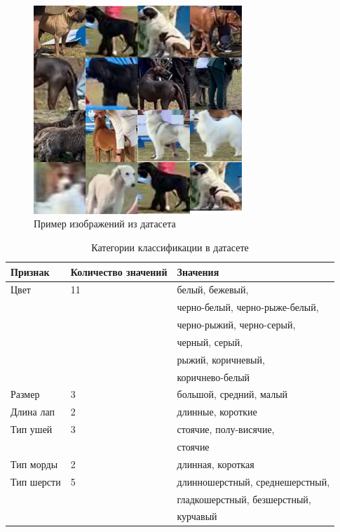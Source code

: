 \begin{figure}[ht]
	\centering
	\includegraphics[width=0.7\textwidth]{images/petsearch/dataset.jpg}
	\caption{Пример изображений из датасета}
	\label{fig:petsearch_dataset}
\end{figure}

\begin{table}[]
    \centering
    \caption{Категории классификации в датасете}
    \begin{tabular}{|l|l|l|}
        \hline
        \multicolumn{1}{|l|}{Признак} & \multicolumn{1}{l|}{Количество значений} & 
        \multicolumn{1}{l|}{Значения}\\ \hline
        Цвет & 11 & белый, бежевый, \\ & & черно-белый, черно-рыже-белый, \\ & & черно-рыжий, черно-серый, \\ & & черный, серый, \\ & & рыжий, коричневый, \\ & & коричнево-белый \\ \hline
        Размер & 3 & большой, средний, малый \\ \hline
        Длина лап & 2 & длинные, короткие \\ \hline
        Тип ушей & 3 & стоячие, полу-висячие, \\ & & стоячие \\ \hline
        Тип морды & 2 & длинная, короткая \\ \hline
        Тип шерсти & 5 & длинношерстный, среднешерстный, \\ & & гладкошерстный, безшерстный, \\ & & курчавый \\ \hline
    \end{tabular}
    \label{tab:datasets_dog}
\end{table}

